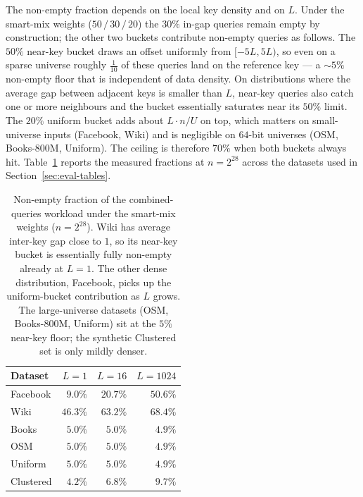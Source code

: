 The non-empty fraction depends on the local key density and on
$L$. Under the smart-mix weights ($50\,/\,30\,/\,20$) the $30\%$
in-gap queries remain empty by construction; the other two
buckets contribute non-empty queries as follows.
The $50\%$ near-key bucket draws an offset uniformly from
$[-5L, 5L)$, so even on a sparse universe roughly
$\tfrac{1}{10}$ of these queries land on the reference key ---
a $\sim\!5\%$ non-empty floor that is independent of data density.
On distributions where the average gap between adjacent keys is
smaller than $L$, near-key queries also catch one or more
neighbours and the bucket essentially saturates near its $50\%$
limit.
The $20\%$ uniform bucket adds about $L \cdot n / U$ on top, which
matters on small-universe inputs (Facebook, Wiki) and is
negligible on $64$-bit universes (OSM, Books-800M, Uniform).
The ceiling is therefore $70\%$ when both buckets always hit.
Table~\ref{tab:nonempty-fraction} reports the measured fractions
at $n = 2^{28}$ across the datasets used in
Section~\ref{sec:eval-tables}.

\begin{table}[H]
    \centering
    \begin{tabular}{@{}lrrr@{}}
        \toprule
        Dataset & $L=1$ & $L=16$ & $L=1024$ \\
        \midrule
        Facebook  & $9.0\%$  & $20.7\%$ & $50.6\%$ \\
        Wiki      & $46.3\%$ & $63.2\%$ & $68.4\%$ \\
        Books     & $5.0\%$  & $5.0\%$  & $4.9\%$  \\
        OSM       & $5.0\%$  & $5.0\%$  & $4.9\%$  \\
        Uniform   & $5.0\%$  & $5.0\%$  & $4.9\%$  \\
        Clustered & $4.2\%$  & $6.8\%$  & $9.7\%$  \\
        \bottomrule
    \end{tabular}
    \caption{Non-empty fraction of the combined-queries workload
        under the smart-mix weights ($n = 2^{28}$). Wiki has
        average inter-key gap close to $1$, so its near-key bucket
        is essentially fully non-empty already at $L = 1$. The
        other dense distribution, Facebook, picks up the
        uniform-bucket contribution as $L$ grows. The
        large-universe datasets (OSM, Books-800M, Uniform) sit at
        the $5\%$ near-key floor; the synthetic Clustered set is
        only mildly denser.}
    \label{tab:nonempty-fraction}
\end{table}
